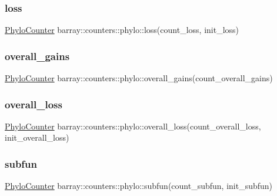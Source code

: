 \mbox{\label{namespacebarray_1_1counters_1_1phylo_ad79aa46e176e6191fb1652f9a13dedcb}} 
\subsubsection{\texorpdfstring{loss}{loss}}
{\footnotesize\ttfamily \hyperlink{namespacebarray_1_1counters_1_1phylo_a89311b835ee762505a62d6cadbd6704b}{Phylo\+Counter} barray\+::counters\+::phylo\+::loss(count\+\_\+loss, init\+\_\+loss)}

\mbox{\label{namespacebarray_1_1counters_1_1phylo_acea59b0d741437e337b0f6bc39d4315a}} 
\subsubsection{\texorpdfstring{overall\+\_\+gains}{overall\_gains}}
{\footnotesize\ttfamily \hyperlink{namespacebarray_1_1counters_1_1phylo_a89311b835ee762505a62d6cadbd6704b}{Phylo\+Counter} barray\+::counters\+::phylo\+::overall\+\_\+gains(count\+\_\+overall\+\_\+gains)}

\mbox{\label{namespacebarray_1_1counters_1_1phylo_ae75fded75a0c3141e188018c887381e1}} 
\subsubsection{\texorpdfstring{overall\+\_\+loss}{overall\_loss}}
{\footnotesize\ttfamily \hyperlink{namespacebarray_1_1counters_1_1phylo_a89311b835ee762505a62d6cadbd6704b}{Phylo\+Counter} barray\+::counters\+::phylo\+::overall\+\_\+loss(count\+\_\+overall\+\_\+loss, init\+\_\+overall\+\_\+loss)}

\mbox{\label{namespacebarray_1_1counters_1_1phylo_ab4e266e94c45d5998c1b6645316f71e7}} 
\subsubsection{\texorpdfstring{subfun}{subfun}}
{\footnotesize\ttfamily \hyperlink{namespacebarray_1_1counters_1_1phylo_a89311b835ee762505a62d6cadbd6704b}{Phylo\+Counter} barray\+::counters\+::phylo\+::subfun(count\+\_\+subfun, init\+\_\+subfun)}

